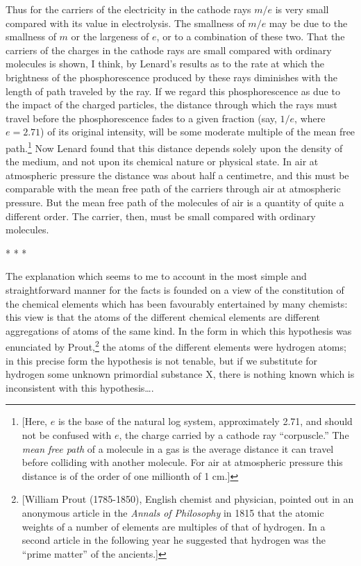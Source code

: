 Thus for the carriers of the electricity in the cathode rays $m/e$
is very small compared with its value in electrolysis. The smallness of
$m/e$ may be due to the smallness of $m$ or the largeness of
$e$, or to a combination of these two. That the carriers of the
charges in the cathode rays are small compared with ordinary molecules
is shown, I think, by Lenard's results as to the rate at which the
brightness of the phosphorescence produced by these rays diminishes with
the length of path traveled by the ray. If we regard this
phosphorescence as due to the impact of the charged particles, the
distance through which the rays must travel before the phosphorescence
fades to a given fraction (say, $1/e$, where $e = 2.71$)
of its original intensity, will be some moderate multiple of the mean
free path.\footnote{{[}Here, $e$ is the
  base of the natural log system, approximately 2.71, and should not be
  confused with $e$, the charge carried by a cathode ray
  ``corpuscle.'' The \emph{mean free path} of a molecule in a gas is the
  average distance it can travel before colliding with another molecule.
  For air at atmospheric pressure this distance is of the order of one
  millionth of 1 cm.{]}} Now Lenard found that this distance depends
solely upon the density of the medium, and not upon its chemical nature
or physical state. In air at atmospheric pressure the distance was about
half a centimetre, and this must be comparable with the mean free path
of the carriers through air at atmospheric pressure. But the mean free
path of the molecules of air is a quantity of quite a different order.
The carrier, then, must be small compared with ordinary molecules.\\
\centerline{* * *}

The explanation which seems to me to account in the most simple and
straight\-for\-ward manner for the facts is founded on a view of the
constitution of the chemical elements which has been favourably
entertained by many chemists: this view is that the atoms of the
different chemical elements are different aggregations of atoms of the
same kind. In the form in which this hypothesis was enunciated by
Prout,\footnote{{[}William Prout (1785-1850), English chemist and
  physician, pointed out in an anonymous article in the \emph{Annals of
  Philosophy} in 1815 that the atomic weights of a number of elements
  are multiples of that of hydrogen. In a second article in the
  following year he suggested that hydrogen was the ``prime matter'' of
  the ancients.{]}} the atoms of the different elements were hydrogen
atoms; in this precise form the hypothesis is not tenable, but if we
substitute for hydrogen some unknown primordial substance X, there is
nothing known which is inconsistent with this hypothesis\ldots.

